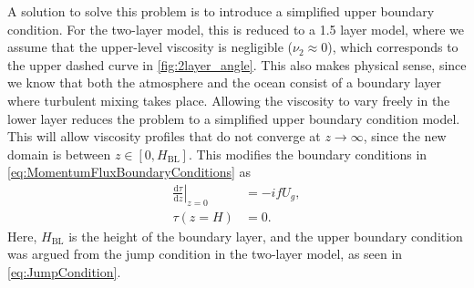 A solution to solve this problem is to introduce a simplified upper boundary condition. For the two-layer model, this is reduced to a 1.5 layer model, where we assume that the upper-level viscosity is negligible ($\nu_2\approx0$), which corresponds to the upper dashed curve in \autoref{fig:2layer_angle}. This also makes physical sense, since we know that both the atmosphere and the ocean consist of a boundary layer where turbulent mixing takes place. Allowing the viscosity to vary freely in the lower layer reduces the problem to a simplified upper boundary condition model. This will allow viscosity profiles that do not converge at $z\rightarrow\infty$, since the new domain is between $z\in[0,H_\text{BL}]$. This modifies the boundary conditions in \autoref{eq:MomentumFluxBoundaryConditions} as 
\begin{subequations}
\label{eq:NewBoundaryConditions}
\begin{align}
    \left.\frac{\mathrm{d}\tau}{\mathrm{d}z}\right|_{z=0} &= -ifU_g,
    \label{eq:NewBoundaryCondition1}
    \\
    \tau(z=H) &= 0.
    \label{eq:NewBoundaryCondition2}
\end{align}
\end{subequations}
Here, $H_\text{BL}$ is the height of the boundary layer, and the upper boundary condition was argued from the jump condition in the two-layer model, as seen in \autoref{eq:JumpCondition}.

